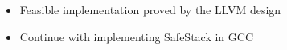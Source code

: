 \begin {itemize}
    \item Feasible implementation proved by the LLVM design
    \item Continue with implementing SafeStack in GCC
\end {itemize}
